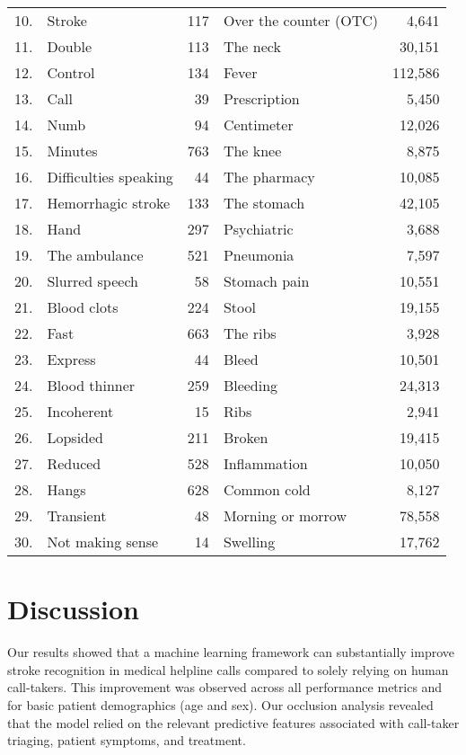 {\begin{table}[t]
{\begin{tabular}{l|lr|lr}
        10. & Stroke & 117 & Over the counter (OTC) & 4,641 \\        
        11. & Double & 113 & The neck & 30,151 \\        
        12. & Control & 134 & Fever & 112,586 \\        
        13. & Call & 39 & Prescription & 5,450 \\        
        14. & Numb & 94 & Centimeter & 12,026 \\        
        15. & Minutes & 763 & The knee & 8,875 \\        
        16. & Difficulties speaking & 44 & The pharmacy & 10,085 \\        
        17. & Hemorrhagic stroke & 133 & The stomach & 42,105 \\        
        18. & Hand & 297 & Psychiatric & 3,688 \\        
        19. & The ambulance & 521 & Pneumonia & 7,597 \\        
        20. & Slurred speech & 58 & Stomach pain & 10,551 \\        
        21. & Blood clots & 224 & Stool & 19,155 \\        
        22. & Fast & 663 & The ribs & 3,928 \\        
        23. & Express & 44 & Bleed & 10,501 \\        
        24. & Blood thinner & 259 & Bleeding & 24,313 \\        
        25. & Incoherent & 15 & Ribs & 2,941 \\        
        26. & Lopsided & 211 & Broken & 19,415 \\        
        27. & Reduced & 528 & Inflammation & 10,050 \\        
        28. & Hangs & 628 & Common cold & 8,127 \\        
        29. & Transient & 48 & Morning or morrow & 78,558 \\        
        30. & Not making sense & 14 & Swelling & 17,762 \\        
        \bottomrule
    \end{tabular}%
    }
\end{table}


\section{Discussion}

Our results showed that a machine learning framework can substantially improve stroke recognition in medical helpline calls compared to solely relying on human call-takers. This improvement was observed across all performance metrics and for basic patient demographics (age and sex). Our occlusion analysis revealed that the model relied on the relevant predictive features associated with call-taker triaging, patient symptoms, and treatment.

}

